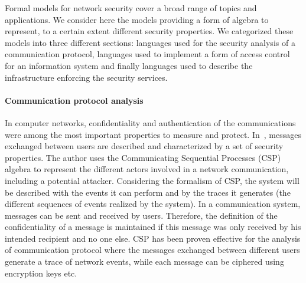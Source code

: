 Formal models for network security cover a broad range of topics and applications.
We consider here the models providing a form of algebra to represent, to a certain extent different security properties. We categorized these models into three different sections: languages used for the security analysis of a communication protocol, languages used to implement a form of access control for an information system and finally languages used to describe the infrastructure enforcing the security services.

\paragraph{Communication protocol analysis}
In computer networks, confidentiality and authentication of the communications were among the most important properties to measure and protect.
In~\cite{CSP-Schneider1996}, messages exchanged between users are described and characterized by a set of security properties.
The author uses the Communicating Sequential Processes (CSP) algebra to represent the different actors involved in a network communication, including a potential attacker. 
Considering the formalism of CSP, the system will be described with the events it can perform and by the traces it generates (\ie the different sequences of events realized by the system).
In a communication system, messages can be sent and received by users.
Therefore, the definition of the confidentiality of a message is maintained if this message was only received by his intended recipient and no one else.
CSP has been proven effective for the analysis of communication protocol where the messages exchanged between different users generate a trace of network events, while each message can be ciphered using encryption keys etc.

